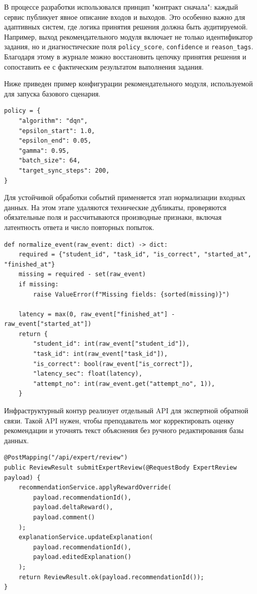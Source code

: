 В процессе разработки использовался принцип "контракт сначала": каждый сервис
публикует явное описание входов и выходов. Это особенно важно для адаптивных
систем, где логика принятия решения должна быть аудитируемой. Например, выход
рекомендательного модуля включает не только идентификатор задания, но и
диагностические поля \texttt{policy\_score}, \texttt{confidence} и
\texttt{reason\_tags}. Благодаря этому в журнале можно восстановить цепочку
принятия решения и сопоставить ее с фактическим результатом выполнения задания.

Ниже приведен пример конфигурации рекомендательного модуля, используемой для
запуска базового сценария.

\begin{lstlisting}[caption={Фрагмент конфигурации рекомендательного модуля}]
policy = {
    "algorithm": "dqn",
    "epsilon_start": 1.0,
    "epsilon_end": 0.05,
    "gamma": 0.95,
    "batch_size": 64,
    "target_sync_steps": 200,
}
\end{lstlisting}

Для устойчивой обработки событий применяется этап нормализации входных данных.
На этом этапе удаляются технические дубликаты, проверяются обязательные поля и
рассчитываются производные признаки, включая латентность ответа и число
повторных попыток.

\begin{lstlisting}[style=sthgcode-python,caption={Пример нормализации входного учебного события}]
def normalize_event(raw_event: dict) -> dict:
    required = {"student_id", "task_id", "is_correct", "started_at", "finished_at"}
    missing = required - set(raw_event)
    if missing:
        raise ValueError(f"Missing fields: {sorted(missing)}")

    latency = max(0, raw_event["finished_at"] - raw_event["started_at"])
    return {
        "student_id": int(raw_event["student_id"]),
        "task_id": int(raw_event["task_id"]),
        "is_correct": bool(raw_event["is_correct"]),
        "latency_sec": float(latency),
        "attempt_no": int(raw_event.get("attempt_no", 1)),
    }
\end{lstlisting}

Инфраструктурный контур реализует отдельный API для экспертной обратной связи.
Такой API нужен, чтобы преподаватель мог корректировать оценку рекомендации и
уточнять текст объяснения без ручного редактирования базы данных.

\begin{lstlisting}[style=sthgcode-java,caption={Пример обработчика экспертной корректировки рекомендации}]
@PostMapping("/api/expert/review")
public ReviewResult submitExpertReview(@RequestBody ExpertReview payload) {
    recommendationService.applyRewardOverride(
        payload.recommendationId(),
        payload.deltaReward(),
        payload.comment()
    );
    explanationService.updateExplanation(
        payload.recommendationId(),
        payload.editedExplanation()
    );
    return ReviewResult.ok(payload.recommendationId());
}
\end{lstlisting}

